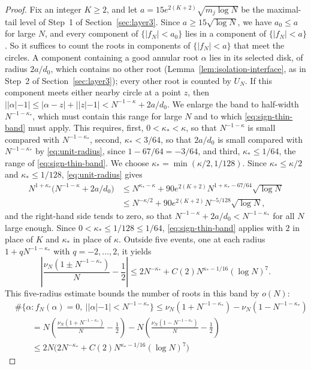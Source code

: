 \begin{proof}
Fix an integer $K\ge2$, and let $a=15e^{2(K+2)}\sqrt{m_j\log N}$ be the
maximal-tail level of Step~1 of Section~\ref{sec:layer3}.
Since $a\ge15\sqrt{\log N}$, we have $a_0\le a$ for large $N$, and every
component of $\{|f_N|<a_0\}$ lies in a component of $\{|f_N|<a\}$. So it
suffices to count the roots in components of $\{|f_N|<a\}$ that meet the
circles.
A component containing a good annular root $\alpha$ lies in its selected
disk, of radius $2a/d_0$, which contains no other root
(Lemma~\ref{lem:isolation-interface}, as in Step~2 of
Section~\ref{sec:layer3}); every other root is counted by $U_N$.
If this component meets either nearby circle at a point $z$, then
$||\alpha|-1|\le|\alpha-z|+||z|-1|<N^{-1-\kappa}+2a/d_0$.
We enlarge the band to half-width $N^{-1-\kappa_*}$, which must contain
this range for large $N$ and to which \eqref{eq:sign-thin-band} must
apply. This requires, first, $0<\kappa_*<\kappa$, so that $N^{-1-\kappa}$
is small compared with $N^{-1-\kappa_*}$, second, $\kappa_*<3/64$, so
that $2a/d_0$ is small compared with $N^{-1-\kappa_*}$ by
\eqref{eq:unit-radius}, since $1-67/64=-3/64$, and third,
$\kappa_*\le1/64$, the range of \eqref{eq:sign-thin-band}.
We choose $\kappa_*=\min(\kappa/2,1/128)$. Since $\kappa_*\le\kappa/2$
and $\kappa_*\le1/128$, \eqref{eq:unit-radius} gives
\begin{align*}
 N^{1+\kappa_*}\bigl(N^{-1-\kappa}+2a/d_0\bigr)
 &\le N^{\kappa_*-\kappa}+90e^{2(K+2)}N^{1+\kappa_*-67/64}\sqrt{\log N}\\
 &\le N^{-\kappa/2}+90e^{2(K+2)}N^{-5/128}\sqrt{\log N},
\end{align*}
and the right-hand side tends to zero, so that
$N^{-1-\kappa}+2a/d_0<N^{-1-\kappa_*}$ for all $N$ large enough.
Since $0<\kappa_*\le1/128\le1/64$,
\eqref{eq:sign-thin-band} applies with $2$ in place of $K$ and $\kappa_*$
in place of $\kappa$. Outside five events, one at each radius
$1+qN^{-1-\kappa_*}$ with $q=-2,\dots,2$, it yields
\[
 \left|\frac{\nu_N(1\pm N^{-1-\kappa_*})}N-\frac12\right|
 \le2N^{-\kappa_*}+C(2)N^{\kappa_*-1/16}(\log N)^7.
\]
This five-radius estimate bounds the number of roots in this band by
$o(N)$:
\begin{align*}
 &\#\{\alpha:f_N(\alpha)=0,\ ||\alpha|-1|<N^{-1-\kappa_*}\}
 \le\nu_N(1+N^{-1-\kappa_*})-\nu_N(1-N^{-1-\kappa_*})\\
 &\qquad=N\left(\frac{\nu_N(1+N^{-1-\kappa_*})}N-\frac12\right)
   -N\left(\frac{\nu_N(1-N^{-1-\kappa_*})}N-\frac12\right)\\
 &\qquad\le2N\bigl(2N^{-\kappa_*}+C(2)N^{\kappa_*-1/16}(\log N)^7\bigr)

\end{align*}
\end{proof}
